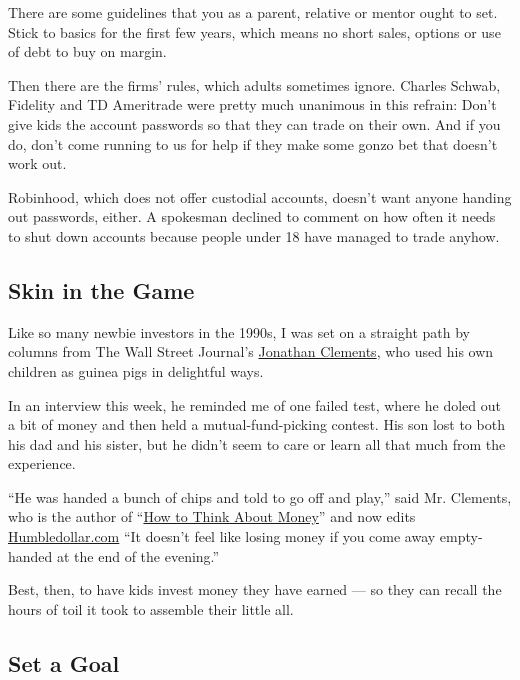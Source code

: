 There are some guidelines that you as a parent, relative or mentor ought
to set. Stick to basics for the first few years, which means no short
sales, options or use of debt to buy on margin.

Then there are the firms' rules, which adults sometimes ignore. Charles
Schwab, Fidelity and TD Ameritrade were pretty much unanimous in this
refrain: Don't give kids the account passwords so that they can trade on
their own. And if you do, don't come running to us for help if they make
some gonzo bet that doesn't work out.

Robinhood, which does not offer custodial accounts, doesn't want anyone
handing out passwords, either. A spokesman declined to comment on how
often it needs to shut down accounts because people under 18 have
managed to trade anyhow.

\hypertarget{skin-in-the-game}{%
\subsection{Skin in the Game}\label{skin-in-the-game}}

Like so many newbie investors in the 1990s, I was set on a straight path
by columns from The Wall Street Journal's
\href{https://www.deseret.com/1995/6/11/19176239/index-funds-are-excellent-if-you-know-what-you-re-doing}{Jonathan
Clements}, who used his own children as guinea pigs in delightful ways.

In an interview this week, he reminded me of one failed test, where he
doled out a bit of money and then held a mutual-fund-picking contest.
His son lost to both his dad and his sister, but he didn't seem to care
or learn all that much from the experience.

``He was handed a bunch of chips and told to go off and play,'' said Mr.
Clements, who is the author of
``\href{https://humbledollar.com/book/how-to-think-about-money/}{How to
Think About Money}'' and now edits
\href{https://humbledollar.com/about/}{Humbledollar.com} ``It doesn't
feel like losing money if you come away empty-handed at the end of the
evening.''

Best, then, to have kids invest money they have earned --- so they can
recall the hours of toil it took to assemble their little all.

\hypertarget{set-a-goal}{%
\subsection{Set a Goal}\label{set-a-goal}}

